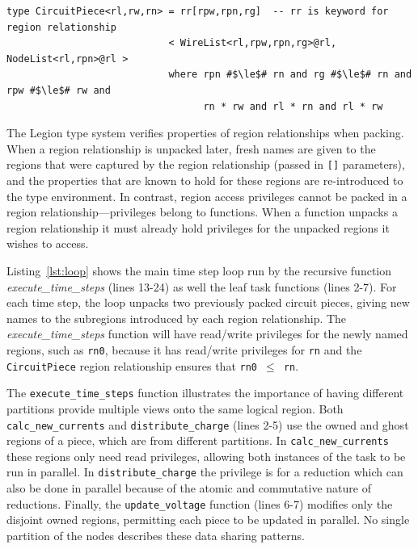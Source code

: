 \begin{lstlisting}[label={lst:rr},caption={Region Relationship Example}]
type CircuitPiece<rl,rw,rn> = rr[rpw,rpn,rg]  -- rr is keyword for region relationship 
                            < WireList<rl,rpw,rpn,rg>@rl, NodeList<rl,rpn>@rl >         
                            where rpn #$\le$# rn and rg #$\le$# rn and rpw #$\le$# rw and
                                  rn * rw and rl * rn and rl * rw
\end{lstlisting}

The Legion type system verifies properties of region relationships when packing.  When
a region relationship is unpacked later, fresh names are given to the regions that were
captured by the region relationship (passed in {\tt []} parameters), and the properties that are known to hold for these
regions are re-introduced to the type environment.
In contrast, region access privileges cannot be packed in a region
relationship---privileges belong to functions. When a function unpacks
a region relationship it must already hold privileges for the unpacked regions it wishes to access.

Listing~\ref{lst:loop} shows the main time step loop run by the 
recursive function {\em execute\_time\_steps} (lines 13-24)
as well the leaf task functions (lines 2-7).  
For each time step, the loop unpacks 
two previously packed circuit pieces, giving new names to the subregions introduced
by each region relationship.  The {\em execute\_time\_steps} function
will have read/write privileges for the newly named regions, such as {\tt rn0},
because it has read/write privileges for {\tt rn} and the {\tt CircuitPiece} 
region relationship ensures that {\tt rn0 $\leq$ rn}.

The {\tt execute\_time\_steps} function   
illustrates the importance of having different partitions provide 
multiple views onto the same logical region.  Both {\tt calc\_new\_currents} 
and {\tt distribute\_charge} (lines 2-5)
use the owned and ghost regions of a piece, which are from different partitions. In
{\tt calc\_new\_currents} these regions only need read
privileges, allowing both instances of the task to be
run in parallel.  In {\tt distribute\_charge} the
privilege is for a reduction which can also be done in parallel
because of the atomic and commutative nature of reductions.  Finally,
the {\tt update\_voltage} function (lines 6-7) modifies only the disjoint owned regions, 
permitting each piece to be updated in parallel.  No single partition of the nodes
describes these data sharing patterns.

